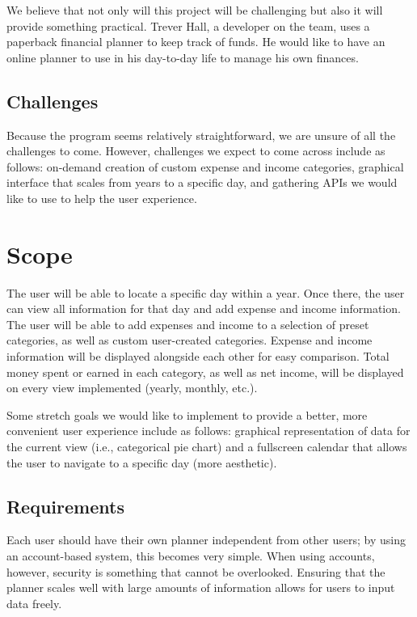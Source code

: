 \documentclass[10pt,conference,onecolumn,compsoc]{IEEEtran}
\begin{document}
We believe that not only will this project will be challenging but also it will provide something practical. Trever Hall, a developer on the team, uses a paperback financial planner to keep track of funds. He would like to have an online planner to use in his day-to-day life to manage his own finances.


\subsection{Challenges}
Because the program seems relatively straightforward, we are unsure of all the challenges to come. However, challenges we expect to come across include as follows: on-demand creation of custom expense and income categories, graphical interface that scales from years to a specific day, and gathering APIs we would like to use to help the user experience.



\section{Scope}
The user will be able to locate a specific day within a year. Once there, the user can view all information for that day and add expense and income information. The user will be able to add expenses and income to a selection of preset categories, as well as custom user-created categories. Expense and income information will be displayed alongside each other for easy comparison. Total money spent or earned in each category, as well as net income, will be displayed on every view implemented (yearly, monthly, etc.).

Some stretch goals we would like to implement to provide a better, more convenient user experience include as follows: graphical representation of data for the current view (i.e., categorical pie chart) and a fullscreen calendar that allows the user to navigate to a specific day (more aesthetic).



\subsection{Requirements}
Each user should have their own planner independent from other users; by using an account-based system, this becomes very simple. When using accounts, however, security is something that cannot be overlooked. Ensuring that the planner scales well with large amounts of information allows for users to input data freely.
\end{document}
